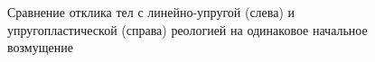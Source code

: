\begin{figure}
\begin{minipage}[h]{0.4\linewidth}
\end{minipage}
\vfill
\begin{minipage}[h]{0.47\linewidth}
 \\
\end{minipage}
\hfill
\begin{minipage}[h]{0.4\linewidth}
 \\
\end{minipage}
\caption{Сравнение отклика тел с линейно-упругой (слева) и упругопластической (справа) реологией на одинаковое начальное возмущение}
\label{pic:plastic-vs-elastic}
\end{figure}

